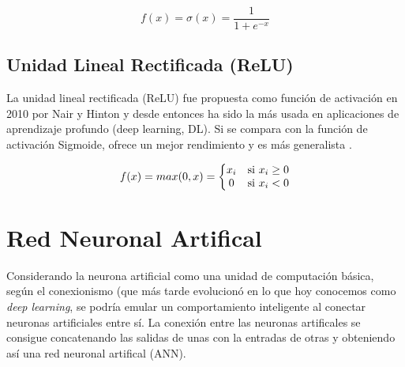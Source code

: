 \begin{equation}
 f(x) = \sigma (x) = \frac{1}{1+e^{-x}}
\end{equation}

\subsection{Unidad Lineal Rectificada (ReLU)}\label{subsubsec:relu}

La unidad lineal rectificada (ReLU) fue propuesta como función de activación en 2010 por Nair y Hinton \cite{Nair2010} y desde entonces ha sido la más usada en aplicaciones de aprendizaje profundo (deep learning, DL). Si se compara con la función de activación Sigmoide, ofrece un mejor rendimiento y es más generalista \cite{nwankpa2018activation}.

\begin{equation}
 f(x) = max(0, x)=\left\{\begin{matrix}
 x_i & $si $ x_i \geq 0 \\ 
 0 & $si $ x_i < 0
\end{matrix}\right.
\end{equation}

\newpage\section{Red Neuronal Artifical}\label{subsec:neural_network}

Considerando la neurona artificial como una unidad de computación básica, según el conexionismo (que más tarde evolucionó en lo que hoy conocemos como \textit{deep learning}, se podría emular un comportamiento inteligente al conectar neuronas artificiales entre sí. La conexión entre las neuronas artificales se consigue concatenando las salidas de unas con la entradas de otras y obteniendo así una red neuronal artifical (ANN).


